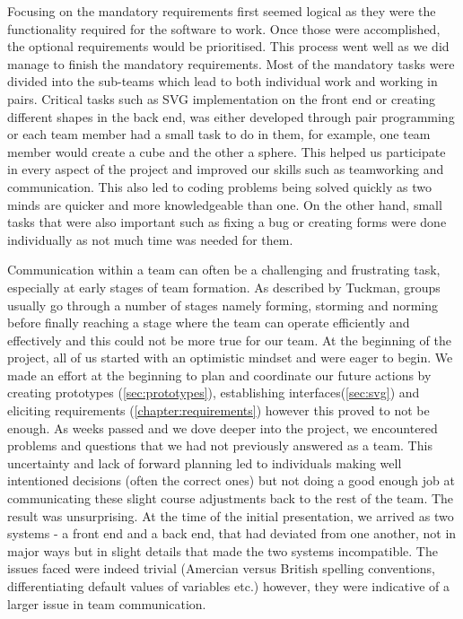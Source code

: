 \documentclass[a4paper]{report}
\begin{document}
	
	\par Focusing on the mandatory requirements first seemed logical as they were the functionality required for the software to work. Once those were accomplished, the optional requirements would be prioritised. This process went well as we did manage to finish the mandatory requirements. Most of the mandatory tasks were divided into the sub-teams which lead to both individual work and working in pairs. Critical tasks such as SVG implementation on the front end or creating different shapes in the back end, was either developed through pair programming or each team member had a small task to do in them, for example, one team member would create a cube and the other a sphere. This helped us participate in every aspect of the project and improved our skills such as teamworking and communication. This also led to coding problems being solved quickly as two minds are quicker and more knowledgeable than one. On the other hand, small tasks that were also important such as fixing a bug or creating forms were done individually as not much time was needed for them.  \newline
	
	\par Communication within a team can often be a challenging and frustrating task, especially at early stages of team formation. As described by Tuckman, groups usually go through a number of stages namely forming, storming and norming before finally reaching a stage where the team can operate efficiently and effectively \cite{tuckman_development_1965} and this could not be more true for our team. At the beginning of the project, all of us started with an optimistic mindset and were eager to begin. We made an effort at the beginning to plan and coordinate our future actions by creating prototypes (\ref{sec:prototypes}), establishing interfaces(\ref{sec:svg}) and eliciting requirements (\ref{chapter:requirements}) however this proved to not be enough. As weeks passed and we dove deeper into the project, we encountered problems and questions that we had not previously answered as a team. This uncertainty and lack of forward planning led to individuals making well intentioned decisions (often the correct ones) but not doing a good enough job at communicating these slight course adjustments back to the rest of the team. The result was unsurprising. At the time of the initial presentation, we arrived as two systems - a front end and a back end, that had deviated from one another, not in major ways but in slight details that made the two systems incompatible. The issues faced were indeed trivial (Amercian versus British spelling conventions, differentiating default values of variables etc.) however, they were indicative of a larger issue in team communication.\newline
	
\end{document}
